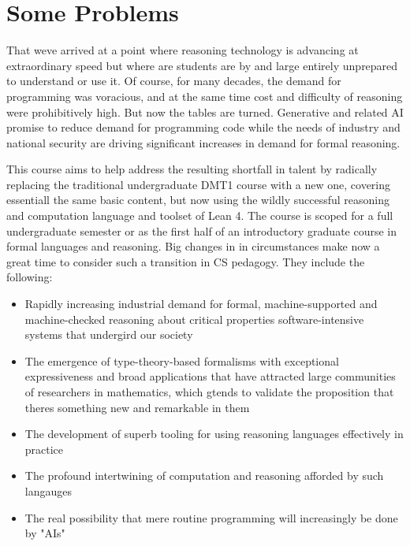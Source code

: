 \documentclass{book}
\providecommand{\tightlist}{%
  \setlength{\itemsep}{0pt}\setlength{\parskip}{0pt}}
\begin{document}
\hypertarget{pandoc.profile.debug__pandoc__debug__src__preface.md__some-problems}{%
\section*{Some Problems}\label{pandoc.profile.debug__pandoc__debug__src__preface.md__some-problems}}

That we\textquotesingle ve arrived at a point where reasoning technology is advancing at extraordinary speed but where are students are by and large entirely unprepared to understand or use it. Of course, for many decades, the demand for programming was voracious, and at the same time cost and difficulty of reasoning were prohibitively high. But now the tables are turned. Generative and related AI promise to reduce demand for programming code while the needs of industry and national security are driving significant increases in demand for formal reasoning.

This course aims to help address the resulting shortfall in talent by radically replacing the traditional undergraduate DMT1 course with a new one, covering essentiall the same basic content, but now using the wildly successful reasoning and computation language and toolset of Lean 4. The course is scoped for a full undergraduate semester or as the first half of an introductory graduate course in formal languages and reasoning. Big changes in in circumstances make now a great time to consider such a transition in CS pedagogy. They include the following:

\begin{itemize}
\tightlist
\item
  Rapidly increasing industrial demand for formal, machine-supported and machine-checked reasoning about critical properties software-intensive systems that undergird our society
\item
  The emergence of type-theory-based formalisms with exceptional expressiveness and broad applications that have attracted large communities of researchers in mathematics, which gtends to validate the proposition that there\textquotesingle s something new and remarkable in them
\item
  The development of superb tooling for using reasoning languages effectively in practice
\item
  The profound intertwining of computation and reasoning afforded by such langauges
\item
  The real possibility that mere routine programming will increasingly be done by "AIs"
\end{itemize}
\end{document}
